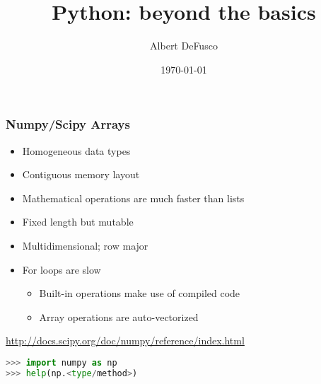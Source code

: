 \documentclass[xcolor=table,10pt,final]{beamer}
\begin{document}
\title{Python: beyond the basics}
\author{Albert DeFusco}
\date{\today}


\frame{\titlepage}
\begin{frame}[fragile]
  \frametitle{Numpy/Scipy Arrays}
  \begin{itemize}
    \item Homogeneous data types
    \item Contiguous memory layout
    \item Mathematical operations are much faster than lists
    \item Fixed length but mutable
    \item Multidimensional; row major
    \item For loops are slow
      \begin{itemize}
        \item Built-in operations make use of compiled code
        \item Array operations are auto-vectorized
      \end{itemize}
  \end{itemize}
  \vskip0.5cm
  \url{http://docs.scipy.org/doc/numpy/reference/index.html}
  \vskip0.5cm
  \begin{lstlisting}[language=python]
>>> import numpy as np
>>> help(np.<type/method>)
  \end{lstlisting}
\end{frame}
\end{document}
